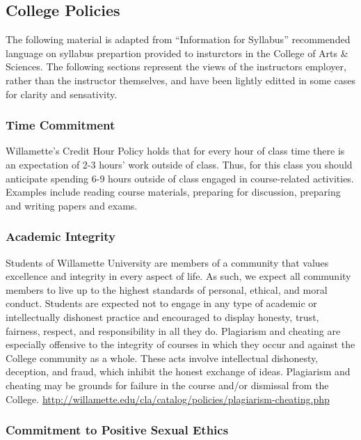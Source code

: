 \subsection*{College Policies}

The following material is adapted from ``Information for Syllabus'' recommended language on syllabus prepartion provided to insturctors in the College of Arts \& Sciences.  The following sections represent the views of the instructors employer, rather than the instructor themselves, and have been lightly editted in some cases for clarity and sensativity.

\subsubsection*{Time Commitment}

Willamette's Credit Hour Policy holds that for every hour of class time there is an expectation of 2-3 hours’ work outside of class.  Thus, for this class you should anticipate spending 6-9 hours outside of class engaged in course-related activities. Examples include reading course materials, preparing for discussion, preparing and writing papers and exams.

\subsubsection*{Academic Integrity}

Students of Willamette University are members of a community that values excellence and integrity in every aspect of life. As such, we expect all community members to live up to the highest standards of personal, ethical, and moral conduct. Students are expected not to engage in any type of academic or intellectually dishonest practice and encouraged to display honesty, trust, fairness, respect, and responsibility in all they do. Plagiarism and cheating are especially offensive to the integrity of courses in which they occur and against the College community as a whole. These acts involve intellectual dishonesty, deception, and fraud, which inhibit the honest exchange of ideas. Plagiarism and cheating may be grounds for failure in the course and/or dismissal from the College. \url{http://willamette.edu/cla/catalog/policies/plagiarism-cheating.php}

\subsubsection*{Commitment to Positive Sexual Ethics}

